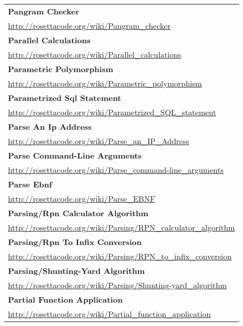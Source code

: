 \begin{longtable}{l}
\textbf{
Pangram Checker } \\ \href{http://rosettacode.org/wiki/Pangram\_checker}{http://rosettacode.org/wiki/Pangram\_checker} \\
\textbf{Parallel Calculations } \\ \href{http://rosettacode.org/wiki/Parallel\_calculations}{http://rosettacode.org/wiki/Parallel\_calculations} \\
\textbf{Parametric Polymorphism } \\ \href{http://rosettacode.org/wiki/Parametric\_polymorphism}{http://rosettacode.org/wiki/Parametric\_polymorphism} \\
\textbf{
Parametrized Sql Statement } \\ \href{http://rosettacode.org/wiki/Parametrized\_SQL\_statement}{http://rosettacode.org/wiki/Parametrized\_SQL\_statement} \\
\textbf{Parse An Ip Address } \\ \href{http://rosettacode.org/wiki/Parse\_an\_IP\_Address}{http://rosettacode.org/wiki/Parse\_an\_IP\_Address} \\
\textbf{
Parse Command-Line Arguments } \\ \href{http://rosettacode.org/wiki/Parse\_command-line\_arguments}{http://rosettacode.org/wiki/Parse\_command-line\_arguments} \\
\textbf{Parse Ebnf } \\ \href{http://rosettacode.org/wiki/Parse\_EBNF}{http://rosettacode.org/wiki/Parse\_EBNF} \\
\textbf{
Parsing/Rpn Calculator Algorithm } \\ \href{http://rosettacode.org/wiki/Parsing/RPN\_calculator\_algorithm}{http://rosettacode.org/wiki/Parsing/RPN\_calculator\_algorithm} \\
\textbf{Parsing/Rpn To Infix Conversion } \\ \href{http://rosettacode.org/wiki/Parsing/RPN\_to\_infix\_conversion}{http://rosettacode.org/wiki/Parsing/RPN\_to\_infix\_conversion} \\
\textbf{
Parsing/Shunting-Yard Algorithm } \\ \href{http://rosettacode.org/wiki/Parsing/Shunting-yard\_algorithm}{http://rosettacode.org/wiki/Parsing/Shunting-yard\_algorithm} \\
\textbf{Partial Function Application } \\ \href{http://rosettacode.org/wiki/Partial\_function\_application}{http://rosettacode.org/wiki/Partial\_function\_application} \\

\end{longtable}
